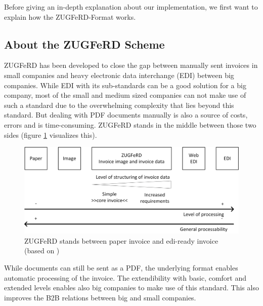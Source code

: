 Before giving an in-depth explanation about our implementation, we first want to explain how the ZUGFeRD-Format works.

\subsection{About the ZUGFeRD Scheme}
\label{sec5.7.1}

ZUGFeRD has been developed to close the gap between manually sent invoices in small companies and heavy electronic data interchange (EDI) between big companies. While EDI with its sub-standards can be a good solution for a big company, most of the small and medium sized companies can not make use of such a standard due to the overwhelming complexity that lies beyond this standard. But dealing with PDF documents manually is also a source of costs, errors and is time-consuming. ZUGFeRD stands in the middle between those two sides (figure \ref{ZugFerdImage} visualizes this).
\begin{figure}[htb!]
\centering
\includegraphics[width=\textwidth,natwidth=144,natheight=59]{Images/ZugFerd/ZugFerd_English.eps}
\caption{ZUGFeRD stands between paper invoice and edi-ready invoice (based on \cite[page 13]{zugFerdSpecificationEnglish})  \label{ZugFerdImage}}
\end{figure}

While documents can still be sent as a PDF, the underlying format enables automatic processing of the invoice. The extendibility with basic, comfort and extended levels enables also big companies to make use of this standard. This also improves the B2B relations between big and small companies.

